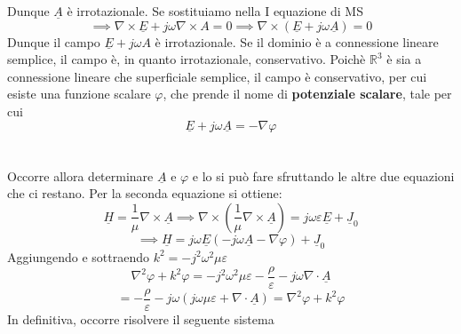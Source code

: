 \documentclass{book}
\begin{document}
            Dunque $\underline{A}$ è irrotazionale. Se sostituiamo nella I equazione di MS
            \begin{equation}
                \implies \nabla \times \underline{E} + j \omega \nabla \times A = 0 \implies \nabla \times (\underline{E}+j \omega \underline{A}) = 0
            \end{equation}
            Dunque il campo $\underline{E}+j\omega A$ è irrotazionale. Se il dominio è a connessione lineare semplice, il campo è, in quanto irrotazionale, conservativo. Poichè $\mathbb{R} ^{3}$ è sia a connessione
            lineare che superficiale semplice, il campo è conservativo, per cui esiste una funzione scalare $\varphi$, che prende il nome di \textbf{potenziale scalare}, tale per cui
            \begin{equation}
                \underline{E}+j \omega \underline{A} = - \nabla \varphi
            \end{equation} \\ \\
            Occorre allora determinare $\underline{A}$ e $\varphi$ e lo si può fare sfruttando le altre due equazioni che ci restano. Per la seconda equazione si ottiene:
            \begin{equation}
                \underline{H} = \frac{1}{\mu} \nabla \times \underline{A} \implies \nabla \times (\frac{1}{\mu} \nabla \times \underline{A}) = j \omega \varepsilon \underline{E}+\underline{J}_{0} 
            \end{equation}
            \begin{equation}
                \implies \underline{H} = j \omega \underline{E}(-j \omega \underline{A}- \nabla \varphi)+\underline{J}_{0}
            \end{equation}
            Aggiungendo e sottraendo $k^{2} = -j^{2} \omega ^{2} \mu \varepsilon$
            \begin{equation}
                \nabla ^{2} \varphi + k ^{2} \varphi = -j^{2} \omega ^{2} \mu \varepsilon - \frac{\rho}{\varepsilon}-j \omega \nabla \cdot \underline{A}
            \end{equation}
            \begin{equation}
                = - \frac{\rho}{\varepsilon}-j\omega (j \omega \mu \varepsilon + \nabla \cdot \underline{A})= \nabla ^{2} \varphi+k ^{2} \varphi
            \end{equation}
            In definitiva, occorre risolvere il seguente sistema
\end{document}
